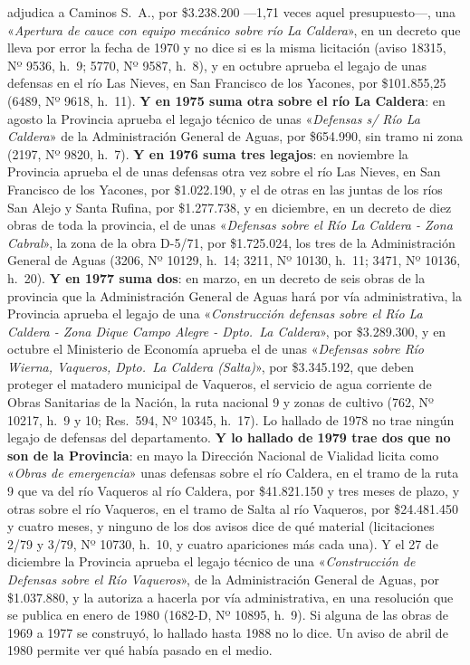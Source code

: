 adjudica a Caminos S.\ A., por \$3.238.200 ---1,71 veces aquel presupuesto---, una «\textit{Apertura de cauce con equipo mecánico sobre río La Caldera}», en un decreto que lleva por error la fecha de 1970 y no dice si es la misma licitación (aviso 18315, Nº 9536, h.\ 9; 5770, Nº 9587, h.\ 8), y en octubre aprueba el legajo de unas defensas en el río Las Nieves, en San Francisco de los Yacones, por \$101.855,25 (6489, Nº 9618, h.\ 11). \textbf{Y en 1975 suma otra sobre el río La Caldera}: en agosto la Provincia aprueba el legajo técnico de unas «\textit{Defensas s/ Río La Caldera}» de la Administración General de Aguas, por \$654.990, sin tramo ni zona (2197, Nº 9820, h.\ 7). \textbf{Y en 1976 suma tres legajos}: en noviembre la Provincia aprueba el de unas defensas otra vez sobre el río Las Nieves, en San Francisco de los Yacones, por \$1.022.190, y el de otras en las juntas de los ríos San Alejo y Santa Rufina, por \$1.277.738, y en diciembre, en un decreto de diez obras de toda la provincia, el de unas «\textit{Defensas sobre el Río La Caldera - Zona Cabral}», la zona de la obra D-5/71, por \$1.725.024, los tres de la Administración General de Aguas (3206, Nº 10129, h.\ 14; 3211, Nº 10130, h.\ 11; 3471, Nº 10136, h.\ 20). \textbf{Y en 1977 suma dos}: en marzo, en un decreto de seis obras de la provincia que la Administración General de Aguas hará por vía administrativa, la Provincia aprueba el legajo de una «\textit{Construcción defensas sobre el Río La Caldera - Zona Dique Campo Alegre - Dpto.\ La Caldera}», por \$3.289.300, y en octubre el Ministerio de Economía aprueba el de unas «\textit{Defensas sobre Río Wierna, Vaqueros, Dpto.\ La Caldera (Salta)}», por \$3.345.192, que deben proteger el matadero municipal de Vaqueros, el servicio de agua corriente de Obras Sanitarias de la Nación, la ruta nacional 9 y zonas de cultivo (762, Nº 10217, h.\ 9 y 10; Res.\ 594, Nº 10345, h.\ 17). Lo hallado de 1978 no trae ningún legajo de defensas del departamento. \textbf{Y lo hallado de 1979 trae dos que no son de la Provincia}: en mayo la Dirección Nacional de Vialidad licita como «\textit{Obras de emergencia}» unas defensas sobre el río Caldera, en el tramo de la ruta 9 que va del río Vaqueros al río Caldera, por \$41.821.150 y tres meses de plazo, y otras sobre el río Vaqueros, en el tramo de Salta al río Vaqueros, por \$24.481.450 y cuatro meses, y ninguno de los dos avisos dice de qué material (licitaciones 2/79 y 3/79, Nº 10730, h.\ 10, y cuatro apariciones más cada una). Y el 27 de diciembre la Provincia aprueba el legajo técnico de una «\textit{Construcción de Defensas sobre el Río Vaqueros}», de la Administración General de Aguas, por \$1.037.880, y la autoriza a hacerla por vía administrativa, en una resolución que se publica en enero de 1980 (1682-D, Nº 10895, h.\ 9). Si alguna de las obras de 1969 a 1977 se construyó, lo hallado hasta 1988 no lo dice. Un
aviso de abril de 1980 permite ver qué había pasado en el medio.

